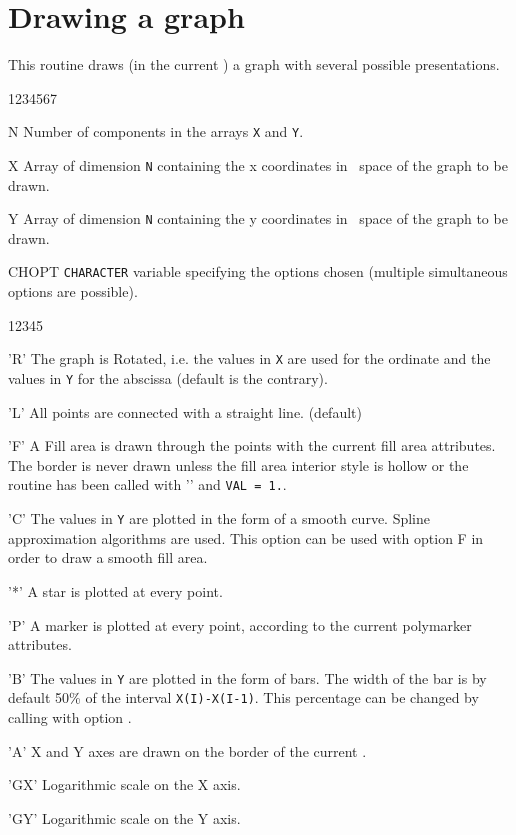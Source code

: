 \section{Drawing a graph}
\Action
This routine draws (in the current \NT) a graph with several possible 
presentations.
\Pdesc
\begin{DLtt}{1234567}
\item[N]     Number of components in the arrays {\tt X} and {\tt Y}.
\item[X]     Array of dimension {\tt N} containing the x coordinates in
             \WC~space of the graph to be drawn.
\item[Y]     Array of dimension {\tt N} containing the y coordinates in
             \WC~space of the graph to be drawn.
\item[CHOPT] {\tt CHARACTER} variable specifying the options chosen (multiple
             simultaneous options are possible).
\begin{DLtt}{12345}
   \item['R'] The graph is Rotated, i.e. the values in {\tt X} are used
              for the ordinate and the values in {\tt Y} for the abscissa
              (default is the contrary).
   \item['L'] All points are connected with a straight line. (default)
   \item['F'] A Fill area is drawn through the points with the current fill area
              attributes. The border is never drawn unless the fill area 
              interior style is hollow or the routine  has been 
              called with '' and {\tt VAL = 1.}.
   \item['C'] The values in {\tt Y} are plotted in the form of a smooth curve.
              Spline approximation algorithms are used. This option can be used
              with option F in order to draw a smooth fill area.
   \item['*'] A star is plotted at every point.
   \item['P'] A marker is plotted at every point, according to the current
              polymarker attributes.
   \item['B'] The values in {\tt Y} are plotted in the form of bars.
              The width of the bar is by default 50\% of the interval
              {\tt X(I)-X(I-1)}. This percentage can be changed by calling
               with option .
   \item['A'] X and Y axes are drawn on the border of the current \NT.
   \item['GX'] Logarithmic scale on the X axis.
   \item['GY'] Logarithmic scale on the Y axis.
\end{DLtt}
\end{DLtt}

